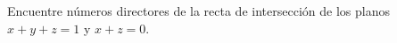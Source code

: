 \item Encuentre números directores de la recta de intersección de los planos $x + y + z = 1$ y $x + z = 0$.
